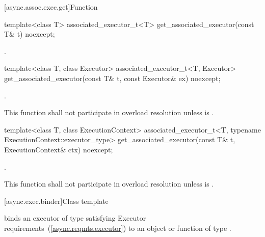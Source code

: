 [async.assoc.exec.get]{Function }

\begin{itemdecl}
template<class T>
  associated_executor_t<T> get_associated_executor(const T& t) noexcept;
\end{itemdecl}

\begin{itemdescr}
\pnum
\returns {}.
\end{itemdescr}

\begin{itemdecl}
template<class T, class Executor>
  associated_executor_t<T, Executor>
    get_associated_executor(const T& t, const Executor& ex) noexcept;
\end{itemdecl}

\begin{itemdescr}
\pnum
\returns {}.

\pnum
\remarks This function shall not participate in overload resolution unless  is .
\end{itemdescr}

\begin{itemdecl}
template<class T, class ExecutionContext>
  associated_executor_t<T, typename ExecutionContext::executor_type>
    get_associated_executor(const T& t, ExecutionContext& ctx) noexcept;
\end{itemdecl}

\begin{itemdescr}
\pnum
\returns {}.

\pnum
\remarks This function shall not participate in overload resolution unless  is .
\end{itemdescr}



[async.exec.binder]{Class template }

\pnum
{} binds an executor of type  satisfying Executor requirements~(\ref{async.reqmts.executor}) to an object or function of type .

